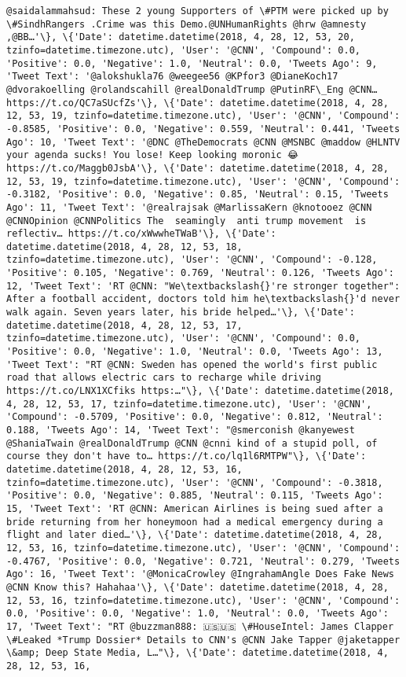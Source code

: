 \documentclass[11pt]{article}
\begin{document}
\begin{Verbatim}[commandchars=\\\{\}]
@saidalammahsud: These 2 young Supporters of \#PTM were picked up by \#SindhRangers .Crime was this Demo.@UNHumanRights @hrw @amnesty ,@BB…'\}, \{'Date': datetime.datetime(2018, 4, 28, 12, 53, 20, tzinfo=datetime.timezone.utc), 'User': '@CNN', 'Compound': 0.0, 'Positive': 0.0, 'Negative': 1.0, 'Neutral': 0.0, 'Tweets Ago': 9, 'Tweet Text': '@alokshukla76 @weegee56 @KPfor3 @DianeKoch17 @dvorakoelling @rolandscahill @realDonaldTrump @PutinRF\_Eng @CNN… https://t.co/QC7aSUcfZs'\}, \{'Date': datetime.datetime(2018, 4, 28, 12, 53, 19, tzinfo=datetime.timezone.utc), 'User': '@CNN', 'Compound': -0.8585, 'Positive': 0.0, 'Negative': 0.559, 'Neutral': 0.441, 'Tweets Ago': 10, 'Tweet Text': '@DNC @TheDemocrats @CNN @MSNBC @maddow @HLNTV your agenda sucks! You lose! Keep looking moronic 😂 https://t.co/Maggb0JsbA'\}, \{'Date': datetime.datetime(2018, 4, 28, 12, 53, 19, tzinfo=datetime.timezone.utc), 'User': '@CNN', 'Compound': -0.3182, 'Positive': 0.0, 'Negative': 0.85, 'Neutral': 0.15, 'Tweets Ago': 11, 'Tweet Text': '@realrajsak @MarlissaKern @knotooez @CNN @CNNOpinion @CNNPolitics The  seamingly  anti trump movement  is reflectiv… https://t.co/xWwwheTWaB'\}, \{'Date': datetime.datetime(2018, 4, 28, 12, 53, 18, tzinfo=datetime.timezone.utc), 'User': '@CNN', 'Compound': -0.128, 'Positive': 0.105, 'Negative': 0.769, 'Neutral': 0.126, 'Tweets Ago': 12, 'Tweet Text': 'RT @CNN: "We\textbackslash{}'re stronger together": After a football accident, doctors told him he\textbackslash{}'d never walk again. Seven years later, his bride helped…'\}, \{'Date': datetime.datetime(2018, 4, 28, 12, 53, 17, tzinfo=datetime.timezone.utc), 'User': '@CNN', 'Compound': 0.0, 'Positive': 0.0, 'Negative': 1.0, 'Neutral': 0.0, 'Tweets Ago': 13, 'Tweet Text': "RT @CNN: Sweden has opened the world's first public road that allows electric cars to recharge while driving https://t.co/LNX1XCfiks https:…"\}, \{'Date': datetime.datetime(2018, 4, 28, 12, 53, 17, tzinfo=datetime.timezone.utc), 'User': '@CNN', 'Compound': -0.5709, 'Positive': 0.0, 'Negative': 0.812, 'Neutral': 0.188, 'Tweets Ago': 14, 'Tweet Text': "@smerconish @kanyewest @ShaniaTwain @realDonaldTrump @CNN @cnni kind of a stupid poll, of course they don't have to… https://t.co/lq1l6RMTPW"\}, \{'Date': datetime.datetime(2018, 4, 28, 12, 53, 16, tzinfo=datetime.timezone.utc), 'User': '@CNN', 'Compound': -0.3818, 'Positive': 0.0, 'Negative': 0.885, 'Neutral': 0.115, 'Tweets Ago': 15, 'Tweet Text': 'RT @CNN: American Airlines is being sued after a bride returning from her honeymoon had a medical emergency during a flight and later died…'\}, \{'Date': datetime.datetime(2018, 4, 28, 12, 53, 16, tzinfo=datetime.timezone.utc), 'User': '@CNN', 'Compound': -0.4767, 'Positive': 0.0, 'Negative': 0.721, 'Neutral': 0.279, 'Tweets Ago': 16, 'Tweet Text': '@MonicaCrowley @IngrahamAngle Does Fake News @CNN Know this? Hahahaa'\}, \{'Date': datetime.datetime(2018, 4, 28, 12, 53, 16, tzinfo=datetime.timezone.utc), 'User': '@CNN', 'Compound': 0.0, 'Positive': 0.0, 'Negative': 1.0, 'Neutral': 0.0, 'Tweets Ago': 17, 'Tweet Text': "RT @buzzman888: 🇺🇸🇺🇸 \#HouseIntel: James Clapper \#Leaked *Trump Dossier* Details to CNN's @CNN Jake Tapper @jaketapper \&amp; Deep State Media, L…"\}, \{'Date': datetime.datetime(2018, 4, 28, 12, 53, 16, 
\end{Verbatim}
\end{document}
